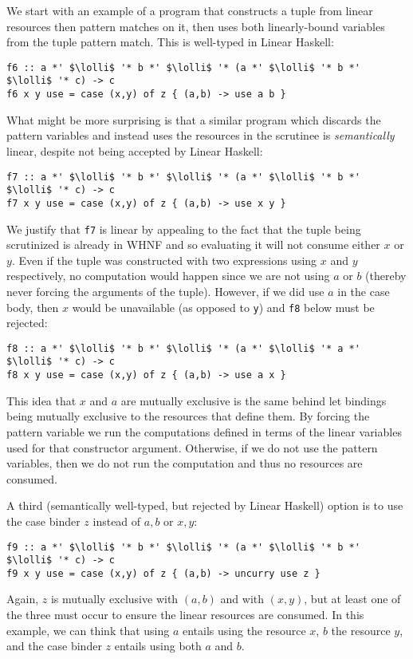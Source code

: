 \documentclass[acmsmall,review,anonymous,screen]{acmart}
\newcommand{\incode}[1]{\lstinline{#1}}
\newcommand{\lolli}{\multimap}
\begin{document}
We start with an
example of a program that constructs a tuple from linear resources then pattern
matches on it, then uses both linearly-bound variables from the tuple pattern
match. This is well-typed in Linear Haskell:
\begin{working}
\begin{lstlisting}
f6 :: a *' $\lolli$ '* b *' $\lolli$ '* (a *' $\lolli$ '* b *' $\lolli$ '* c) -> c
f6 x y use = case (x,y) of z { (a,b) -> use a b }
\end{lstlisting}
\end{working}
What might be more surprising is that a similar program which discards the
pattern variables and instead uses the resources in the scrutinee is 
\emph{semantically} linear, despite not being accepted by Linear Haskell:
\begin{notyet}
\begin{lstlisting}
f7 :: a *' $\lolli$ '* b *' $\lolli$ '* (a *' $\lolli$ '* b *' $\lolli$ '* c) -> c
f7 x y use = case (x,y) of z { (a,b) -> use x y }
\end{lstlisting}
\end{notyet}
We justify that \incode{f7} is linear by appealing to the fact that 
the tuple being scrutinized is already in WHNF and so evaluating it will
not consume either $x$ or $y$. Even if the tuple was constructed with
two expressions using $x$ and $y$ respectively, no computation would happen
since we are not using $a$ or $b$ (thereby never forcing the arguments
of the tuple). However, if we did use $a$ in the case body, then $x$
would be unavailable (as opposed to \incode{y}) and \incode{f8} below must be rejected:
\begin{noway}
\begin{lstlisting}
f8 :: a *' $\lolli$ '* b *' $\lolli$ '* (a *' $\lolli$ '* a *' $\lolli$ '* c) -> c
f8 x y use = case (x,y) of z { (a,b) -> use a x }
\end{lstlisting}
\end{noway}
This idea that $x$ and $a$ are mutually exclusive is the same behind let
bindings being mutually exclusive to the resources that define them.
By forcing the pattern variable we run the computations
defined in terms of the linear variables used for that constructor
argument. Otherwise, if we do not use the pattern variables, then we
do not run the computation and thus no resources are consumed.

A third (semantically well-typed, but rejected by Linear Haskell) option is to use the case binder $z$ instead of $a,b$ or $x,y$:
\begin{notyet}
\begin{lstlisting}
f9 :: a *' $\lolli$ '* b *' $\lolli$ '* (a *' $\lolli$ '* b *' $\lolli$ '* c) -> c
f9 x y use = case (x,y) of z { (a,b) -> uncurry use z }
\end{lstlisting}
\end{notyet}
Again, $z$ is mutually exclusive with $(a,b)$ and with $(x,y)$, but at least one of
the three must occur to ensure the linear resources are consumed. In this
example, we can think that using $a$ entails using the resource $x$, $b$ the
resource $y$, and the case binder $z$ entails using both $a$ and $b$.
\end{document}
